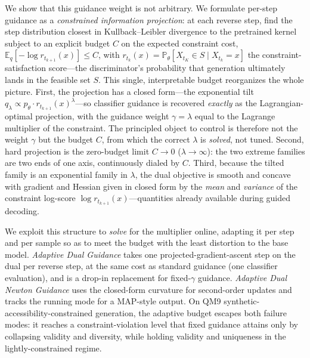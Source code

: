 \documentclass{article}
\newcommand{\E}{\mathbb{E}}
\begin{document}
We show that this guidance weight is not arbitrary. We formulate per-step guidance as a \emph{constrained information projection}: at each reverse step, find the step distribution closest in Kullback--Leibler divergence to the pretrained kernel subject to an explicit budget $C$ on the expected constraint cost, $\E_q[-\log r_{t_{k+1}}(x)]\le C$, with $r_{t_k}(x)=\mathbb P_\theta[X_{t_K}\in S\mid X_{t_k}=x]$ the constraint-satisfaction score---the discriminator's probability that generation ultimately lands in the feasible set $S$. This single, interpretable budget reorganizes the whole picture. First, the projection has a closed form---the exponential tilt $q_\lambda\propto p_\theta\cdot r_{t_{k+1}}(x)^\lambda$---so classifier guidance is recovered \emph{exactly} as the Lagrangian-optimal projection, with the guidance weight $\gamma=\lambda$ equal to the Lagrange multiplier of the constraint. The principled object to control is therefore not the weight $\gamma$ but the budget $C$, from which the correct $\lambda$ is \emph{solved}, not tuned. Second, hard projection is the zero-budget limit $C\!\to\!0$ ($\lambda\!\to\!\infty$): the two extreme families are two ends of one axis, continuously dialed by $C$. Third, because the tilted family is an exponential family in $\lambda$, the dual objective is smooth and concave with gradient and Hessian given in closed form by the \emph{mean} and \emph{variance} of the constraint log-score $\log r_{t_{k+1}}(x)$---quantities already available during guided decoding.

We exploit this structure to \emph{solve} for the multiplier online, adapting it per step and per sample so as to meet the budget with the least distortion to the base model. \emph{Adaptive Dual Guidance} takes one projected-gradient-ascent step on the dual per reverse step, at the same cost as standard guidance (one classifier evaluation), and is a drop-in replacement for fixed-$\gamma$ guidance. \emph{Adaptive Dual Newton Guidance} uses the closed-form curvature for second-order updates and tracks the running mode for a MAP-style output. On QM9 synthetic-accessibility-constrained generation, the adaptive budget escapes both failure modes: it reaches a constraint-violation level that fixed guidance attains only by collapsing validity and diversity, while holding validity and uniqueness in the lightly-constrained regime.
\end{document}
